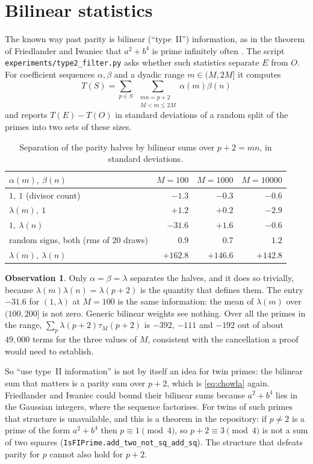 \documentclass[11pt]{article}
\theoremstyle{definition}
\newtheorem{observation}[theorem]{Observation}
\theoremstyle{remark}
\newcommand{\lean}[1]{\texttt{#1}}
\begin{document}
\section{Bilinear statistics}\label{sec:type2}

The known way past parity is bilinear (``type~II'') information, as in the
theorem of Friedlander and Iwaniec that $a^2+b^4$ is prime infinitely often
\cite{fi}. The script \lean{experiments/type2\_filter.py} asks whether such
statistics separate $E$ from $O$. For coefficient sequences $\alpha,\beta$ and a
dyadic range $m\in(M,2M]$ it computes
\[
T(S)=\sum_{p\in S}\;\sum_{\substack{mn=p+2\\ M<m\le 2M}}\alpha(m)\beta(n)
\]
and reports $T(E)-T(O)$ in standard deviations of a random split of the primes
into two sets of these sizes.

\begin{table}[h]
\centering
\begin{tabular}{lrrr}
\toprule
$\alpha(m),\ \beta(n)$ & $M=100$ & $M=1000$ & $M=10000$ \\
\midrule
$1,\ 1$ (divisor count) & $-1.3$ & $-0.3$ & $-0.6$ \\
$\lambda(m),\ 1$ & $+1.2$ & $+0.2$ & $-2.9$ \\
$1,\ \lambda(n)$ & $-31.6$ & $+1.6$ & $-0.6$ \\
random signs, both (rms of 20 draws) & $0.9$ & $0.7$ & $1.2$ \\
$\lambda(m),\ \lambda(n)$ & $+162.8$ & $+146.6$ & $+142.8$ \\
\bottomrule
\end{tabular}
\caption{Separation of the parity halves by bilinear sums over $p+2=mn$,
in standard deviations.}
\label{tab:type2}
\end{table}

\begin{observation}
Only $\alpha=\beta=\lambda$ separates the halves, and it does so trivially,
because $\lambda(m)\lambda(n)=\lambda(p+2)$ is the quantity that defines them.
The entry $-31.6$ for $(1,\lambda)$ at $M=100$ is the same information: the mean
of $\lambda(m)$ over $(100,200]$ is not zero. Generic bilinear weights see
nothing. Over all the primes in the range, $\sum_p\lambda(p+2)\tau_M(p+2)$ is
$-392$, $-111$ and $-192$ out of about $49{,}000$ terms for the three values of
$M$, consistent with the cancellation a proof would need to establish.
\end{observation}

So ``use type~II information'' is not by itself an idea for twin primes: the
bilinear sum that matters is a parity sum over $p+2$, which is
\eqref{eq:chowla} again. Friedlander and Iwaniec could bound their bilinear sums
because $a^2+b^4$ lies in the Gaussian integers, where the sequence factorises.
For twins of such primes that structure is unavailable, and this is a theorem
in the repository: if $p\ne2$ is a prime of the form $a^2+b^4$ then
$p\equiv1\pmod4$, so $p+2\equiv3\pmod4$ is not a sum of two squares
(\lean{IsFIPrime.add\_two\_not\_sq\_add\_sq}). The structure that defeats parity
for $p$ cannot also hold for $p+2$.
\end{document}
